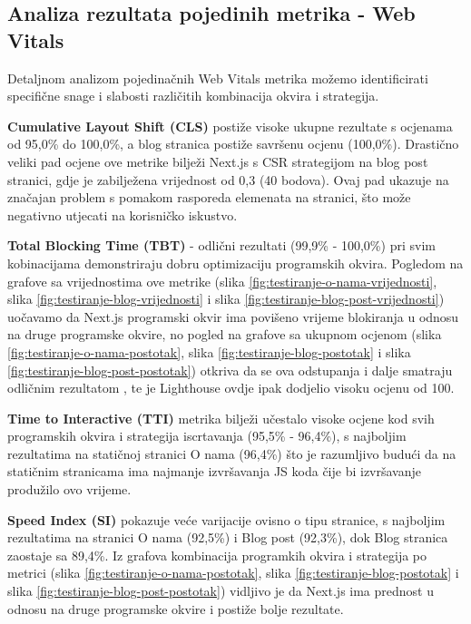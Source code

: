 \subsection{Analiza rezultata pojedinih metrika - Web Vitals}

Detaljnom analizom pojedinačnih Web Vitals metrika možemo identificirati specifične snage i slabosti različitih kombinacija okvira i strategija.

\textbf{Cumulative Layout Shift (CLS)} postiže visoke ukupne rezultate s ocjenama od 95,0\% do 100,0\%, a blog stranica postiže savršenu ocjenu (100,0\%). Drastično veliki pad ocjene ove metrike bilježi Next.js s CSR strategijom na blog post stranici, gdje je zabilježena vrijednost od 0,3 (40 bodova). Ovaj pad ukazuje na značajan problem s pomakom rasporeda elemenata na stranici, što može negativno utjecati na korisničko iskustvo.

\textbf{Total Blocking Time (TBT)} - odlični rezultati (99,9\% - 100,0\%) pri svim kobinacijama demonstriraju dobru optimizaciju programskih okvira. Pogledom na grafove sa vrijednostima ove metrike  (slika \ref{fig:testiranje-o-nama-vrijednosti}, slika \ref{fig:testiranje-blog-vrijednosti} i slika \ref{fig:testiranje-blog-post-vrijednosti}) uočavamo da Next.js programski okvir ima povišeno vrijeme blokiranja u odnosu na druge programske okvire, no pogled na grafove sa ukupnom ocjenom (slika \ref{fig:testiranje-o-nama-postotak}, slika \ref{fig:testiranje-blog-postotak} i slika \ref{fig:testiranje-blog-post-postotak}) otkriva da se ova odstupanja i dalje smatraju odličnim rezultatom \cite{chrome2025tbt}, te je Lighthouse ovdje ipak dodjelio visoku ocjenu od 100.

\textbf{Time to Interactive (TTI)} metrika bilježi učestalo visoke ocjene kod svih programskih okvira i strategija iscrtavanja (95,5\% - 96,4\%), s najboljim rezultatima na statičnoj stranici O nama (96,4\%) što je razumljivo budući da na statičnim stranicama ima najmanje izvršavanja JS koda čije bi izvršavanje produžilo ovo vrijeme.

\textbf{Speed Index (SI)} pokazuje veće varijacije ovisno o tipu stranice, s najboljim rezultatima na stranici O nama (92,5\%) i Blog post (92,3\%), dok Blog stranica zaostaje sa 89,4\%. Iz grafova kombinacija programkih okvira i strategija po metrici (slika  \ref{fig:testiranje-o-nama-postotak}, slika \ref{fig:testiranje-blog-postotak} i slika \ref{fig:testiranje-blog-post-postotak}) vidljivo je da Next.js ima prednost u odnosu na druge programske okvire i postiže bolje rezultate.

